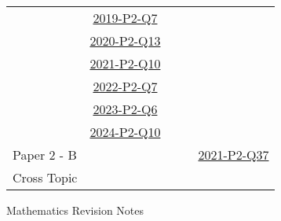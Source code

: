 \documentclass[12pt, a4paper]{article}
\begin{document}
\begin{absolutelynopagebreak}
\begin{center}
\begin{tabular}{|l|c|c|c|c|}
& \hyperref[DSE2019-CoreP2-Q07]{2019-P2-Q7} &  &  &  \\
& \hyperref[DSE2020-CoreP2-Q13]{2020-P2-Q13} &  &  &  \\
& \hyperref[DSE2021-CoreP2-Q10]{2021-P2-Q10} &  &  &  \\
& \hyperref[DSE2022-CoreP2-Q07]{2022-P2-Q7} &  &  &  \\
& \hyperref[DSE2023-CoreP2-Q06]{2023-P2-Q6} &  &  &  \\
& \hyperref[DSE2024-CoreP2-Q10]{2024-P2-Q10} &  &  &  \\
\hline
Paper 2 - B&  &  &  & \hyperref[DSE2021-CoreP2-Q37]{2021-P2-Q37} \\
\hline
\hline
Cross Topic&  &  &  &  \\
\hline
\end{tabular}
\end{center}
\end{absolutelynopagebreak}
\newpage
\newpage
\thispagestyle{empty}
\begin{center}
Mathematics Revision Notes\\\vspace{1cm}
\\\vspace{1cm}
{\fontsize{24pt}{24pt}\selectfont {Linear Programming \NF}} \\\vspace{1cm}
\label{chapter:S5-4}

\end{center}
\vspace{0.5cm}
\hline
\end{document}
